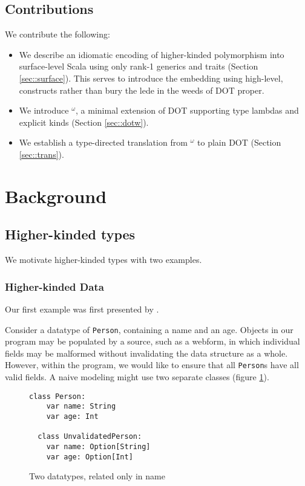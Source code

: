 \documentclass[acmsmall,screen]{acmart}
\newcommand{\DOTw}{\text{DOT}$^\omega$}
\begin{document}
\subsection{Contributions}

We contribute the following:

\begin{itemize}
  \item We describe an idiomatic encoding of higher-kinded polymorphism into
    surface-level Scala using only rank-1 generics and traits (Section
    \ref{sec::surface}). This serves to introduce the embedding using
    high-level, constructs rather than bury the lede in the weeds of DOT
    proper.
  \item We introduce \DOTw{}, a minimal extension of DOT supporting type
    lambdas and explicit kinds (Section \ref{sec::dotw}).
  \item We establish a type-directed translation from \DOTw{} to plain DOT
    (Section \ref{sec::trans}).
\end{itemize}

\section{Background}

\subsection{Higher-kinded types}

We motivate higher-kinded types with two examples.

\subsubsection{Higher-kinded Data}

Our first example was first presented by \cite{macguire_hkd}.

Consider a datatype of \texttt{Person}, containing a name and an age.
Objects in our program may be populated by a source, such as a webform, in
which individual fields may be malformed without invalidating the data
structure as a whole. However, within the program, we would like to ensure
that all \texttt{Person}s have all valid fields. A naive modeling might use
two separate classes (figure \ref{fig::person-bad}).

\begin{figure}[ht]
  \begin{lstlisting}[style=scala]
  class Person:
    var name: String
    var age: Int

  class UnvalidatedPerson:
    var name: Option[String]
    var age: Option[Int]
  \end{lstlisting}
  \caption{Two datatypes, related only in name}\label{fig::person-bad}
\end{figure}
\end{document}
